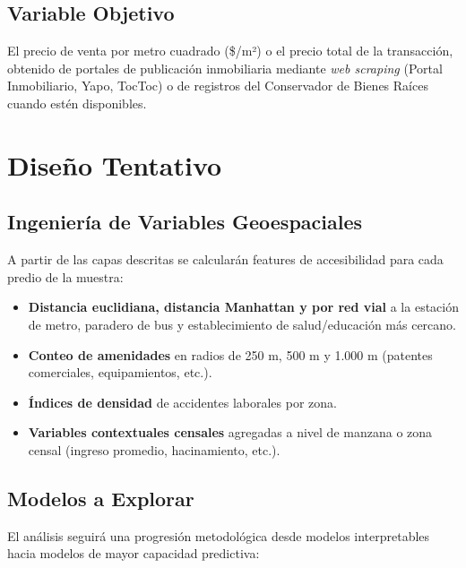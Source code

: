 \documentclass[12pt, letterpaper]{article}
\begin{document}
\subsection{Variable Objetivo}

El precio de venta por metro cuadrado (\$/m²) o el precio total de la transacción,
obtenido de portales de publicación inmobiliaria mediante \textit{web scraping}
(Portal Inmobiliario, Yapo, TocToc) o de registros del Conservador de Bienes
Raíces cuando estén disponibles.

\section{Diseño Tentativo}

\subsection{Ingeniería de Variables Geoespaciales}

A partir de las capas descritas se calcularán features de accesibilidad para
cada predio de la muestra:

\begin{itemize}[leftmargin=1.5em, itemsep=0.3em]
  \item \textbf{Distancia euclidiana, distancia Manhattan y por red vial} a la estación de metro,
        paradero de bus y establecimiento de salud/educación más cercano.
  \item \textbf{Conteo de amenidades} en radios de 250 m, 500 m y 1.000 m
        (patentes comerciales, equipamientos, etc.).
  \item \textbf{Índices de densidad} de accidentes laborales por zona.
  \item \textbf{Variables contextuales censales} agregadas a nivel de manzana
        o zona censal (ingreso promedio, hacinamiento, etc.).
\end{itemize}

\subsection{Modelos a Explorar}

El análisis seguirá una progresión metodológica desde modelos interpretables
hacia modelos de mayor capacidad predictiva:
\end{document}
